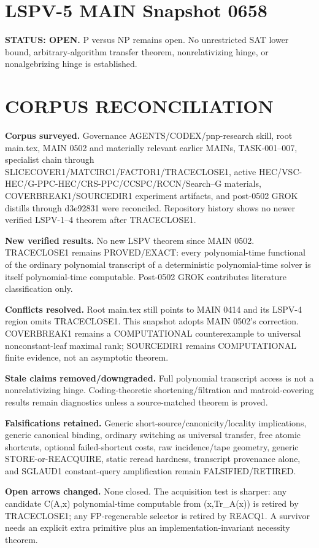 \documentclass[11pt]{article}\usepackage[margin=.86in]{geometry}\usepackage{amsmath,amssymb}
\begin{document}
\section*{LSPV-5 MAIN Snapshot 0658}
\textbf{STATUS: OPEN.} P versus NP remains open. No unrestricted SAT lower bound, arbitrary-algorithm transfer theorem, nonrelativizing hinge, or nonalgebrizing hinge is established.

\section*{CORPUS RECONCILIATION}
\textbf{Corpus surveyed.} Governance AGENTS/CODEX/pnp-research skill, root main.tex, MAIN 0502 and materially relevant earlier MAINs, TASK-001--007, specialist chain through SLICECOVER1/MATCIRC1/FACTOR1/TRACECLOSE1, active HEC/VSC-HEC/G-PPC-HEC/CRS-PPC/CCSPC/RCCN/Search--G materials, COVERBREAK1/SOURCEDIR1 experiment artifacts, and post-0502 GROK distills through d3e92831 were reconciled. Repository history shows no newer verified LSPV-1--4 theorem after TRACECLOSE1.

\textbf{New verified results.} No new LSPV theorem since MAIN 0502. TRACECLOSE1 remains PROVED/EXACT: every polynomial-time functional of the ordinary polynomial transcript of a deterministic polynomial-time solver is itself polynomial-time computable. Post-0502 GROK contributes literature classification only.

\textbf{Conflicts resolved.} Root main.tex still points to MAIN 0414 and its LSPV-4 region omits TRACECLOSE1. This snapshot adopts MAIN 0502's correction. COVERBREAK1 remains a COMPUTATIONAL counterexample to universal nonconstant-leaf maximal rank; SOURCEDIR1 remains COMPUTATIONAL finite evidence, not an asymptotic theorem.

\textbf{Stale claims removed/downgraded.} Full polynomial transcript access is not a nonrelativizing hinge. Coding-theoretic shortening/filtration and matroid-covering results remain diagnostics unless a source-matched theorem is proved.

\textbf{Falsifications retained.} Generic short-source/canonicity/locality implications, generic canonical binding, ordinary switching as universal transfer, free atomic shortcuts, optional failed-shortcut costs, raw incidence/tape geometry, generic STORE-or-REACQUIRE, static reread hardness, transcript provenance alone, and SGLAUD1 constant-query amplification remain FALSIFIED/RETIRED.

\textbf{Open arrows changed.} None closed. The acquisition test is sharper: any candidate C(A,x) polynomial-time computable from (x,Tr_A(x)) is retired by TRACECLOSE1; any FP-regenerable selector is retired by REACQ1. A survivor needs an explicit extra primitive plus an implementation-invariant necessity theorem.
\end{document}
